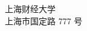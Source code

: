 

\clearpage
\thispagestyle{empty}
\vspace*{\fill}
\begin{center}
{\heiti 上海财经大学}\\[1.2em]
{\songti 上海市国定路 777 号}
\end{center}
\vspace*{\fill}
